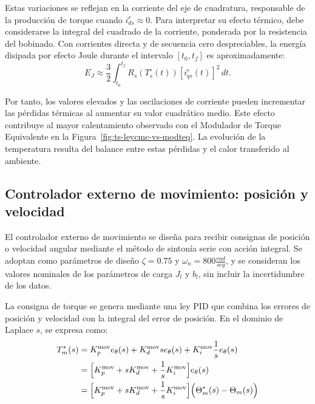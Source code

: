 \documentclass[blue,fullpaper]{ludusofficial}  %
\begin{document}
Estas variaciones se reflejan en la corriente del eje de
cuadratura, responsable de la producción de torque cuando
$i_{ds}^{r}\approx 0$. Para interpretar su efecto térmico,
debe considerarse la integral del cuadrado de la corriente,
ponderada por la resistencia del bobinado. Con corrientes
directa y de secuencia cero despreciables, la energía disipada
por efecto Joule durante el intervalo $[t_0,t_f]$ es
aproximadamente:
\begin{equation}
    E_J \approx \frac{3}{2}
    \int_{t_0}^{t_f}
    R_s\!\left(T_s^\circ(t)\right)
    \left[i_{qs}^{r}(t)\right]^2\,dt.
\end{equation}

Por tanto, los valores elevados y las oscilaciones de corriente
pueden incrementar las pérdidas térmicas al aumentar su valor
cuadrático medio. Este efecto contribuye al mayor calentamiento
observado con el Modulador de Torque Equivalente en la
Figura~\ref{fig:ts-leycmc-vs-modteq}. La evolución de la
temperatura resulta del balance entre estas pérdidas y el
calor transferido al ambiente.

\subsection{Controlador externo de movimiento: posición y velocidad}

El controlador externo de movimiento se diseña para recibir consignas de posición o velocidad angular mediante el método de sintonía serie con acción integral. Se adoptan como parámetros de diseño $\zeta = 0.75$ y $\omega_{n}=800 \frac{rad}{seg}$, y se consideran los valores nominales de los parámetros de carga $J_{l}$ y $b_{l}$, sin incluir la incertidumbre de los datos.

La consigna de torque se genera mediante una ley PID que combina los errores de posición y velocidad con la integral del error de posición. En el dominio de Laplace $s$, se expresa como:
\begin{align}
T_{m}^{*}(s) & = K_{p}^{\text{mov}}e_{\theta}(s) + K_{d}^{\text{mov}}s e_{\theta}(s) + K_{i}^{\text{mov}} \frac{1}{s} e_{\theta}(s)
\notag \\
 & = \Big[  K_{p}^{\text{mov}} + sK_{d}^{\text{mov}} + \frac{1}{s}K_{i}^{\text{mov}} \Big] e_{\theta}(s)
\notag \\
 & = \Big[  K_{p}^{\text{mov}} + sK_{d}^{\text{mov}} + \frac{1}{s}K_{i}^{\text{mov}} \Big] \Big( \Theta^{*}_{m}(s) - \Theta_{m}(s) \Big) %
\label{eq:pid-movimiento}
\end{align}
\end{document}
